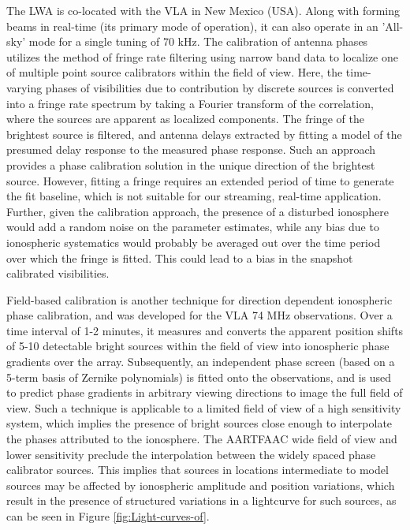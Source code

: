 \documentclass{aa}
\begin{document}
The  LWA  \citep{ellingsonLWA1}  is  co-located  with  the  VLA  in  New  Mexico
(USA). Along with forming beams in real-time (its primary mode of operation), it
can  also operate  in an  'All-sky' mode  for a  single tuning  of 70  kHz.  The
calibration of antenna phases utilizes the method of fringe rate filtering using
narrow band data to localize one of multiple point source calibrators within the
field of view. Here, the time-varying phases of visibilities due to contribution
by discrete sources is converted into a fringe rate spectrum by taking a Fourier
transform  of the  correlation,  where  the sources  are  apparent as  localized
components. The fringe  of the brightest source is  filtered, and antenna delays
extracted by  fitting a  model of  the presumed delay  response to  the measured
phase response.  Such  an approach provides a phase  calibration solution in the
unique direction of the brightest source.  However, fitting a fringe requires an
extended period of time to generate  the fit baseline, which is not suitable for
our streaming, real-time application.   Further, given the calibration approach,
the presence of a disturbed ionosphere would add a random noise on the parameter
estimates,  while any  bias due  to  ionospheric systematics  would probably  be
averaged out  over the time period over  which the fringe is  fitted. This could
lead to a bias in the snapshot calibrated visibilities.

Field-based  calibration  \citep{cottona2004beyond}  is  another  technique  for
direction dependent ionospheric phase calibration, and was developed for the VLA
74  MHz observations.   Over a  time interval  of 1-2  minutes, it  measures and
converts the apparent  position shifts of 5-10 detectable  bright sources within
the field of view into ionospheric phase gradients over the array. Subsequently,
an independent phase screen (based on  a 5-term basis of Zernike polynomials) is
fitted  onto  the  observations, and  is  used  to  predict phase  gradients  in
arbitrary viewing directions to image the  full field of view.  Such a technique
is applicable  to a limited  field of view  of a high sensitivity  system, which
implies the  presence of bright sources  close enough to  interpolate the phases
attributed  to  the  ionosphere. The  AARTFAAC  wide  field  of view  and  lower
sensitivity  preclude   the  interpolation  between  the   widely  spaced  phase
calibrator  sources.  This  implies that  sources in  locations  intermediate to
model sources may be affected  by ionospheric amplitude and position variations,
which result in  the presence of structured variations in  a lightcurve for such
sources, as can be seen in Figure \ref{fig:Light-curves-of}.
\end{document}
